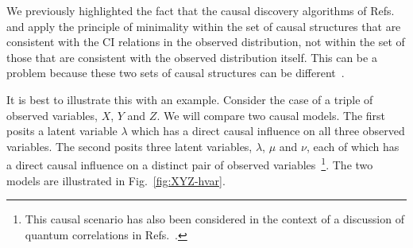 \documentclass[letterpaper,onecolumn,nofootinbib]{revtex4}
\begin{document}
We previously highlighted the fact that the causal discovery algorithms of Refs.~\cite{Pearl2009} and \cite{Spirtes2001} apply the principle of minimality within the set of causal structures that are consistent with the CI relations in the observed distribution, not within the set of those that are consistent with the observed distribution itself.  This can be a problem because these two sets of causal structures can be different~\cite{Verma1993}.

It is best to illustrate this with an example.  Consider the case of a triple of observed variables, $X$, $Y$ and $Z$.  We will compare two causal models.  The first posits a latent variable $\lambda$ which has a direct causal influence on all three observed variables.  The second posits three latent variables, $\lambda$, $\mu$ and $\nu$, each of which has a direct causal influence on a distinct pair of observed variables~\footnote{This causal scenario has also been considered in the context of a discussion of quantum correlations in Refs.~\cite{Branciard,Fritz2012}.}.  The two models are illustrated in Fig.~\ref{fig:XYZ-hvar}.
\end{document}
